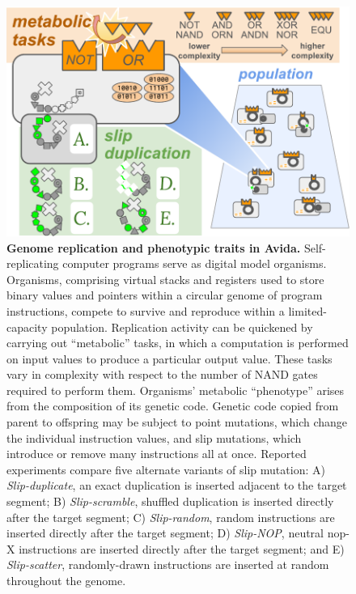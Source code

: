 \begin{figure}[!ht]
  \centering
  \includegraphics[width=\linewidth]{imgs/GeneDupeOps.pdf}
    \caption{%
 \textbf{Genome replication and phenotypic traits in Avida.}
 \footnotesize
 Self-replicating computer programs serve as digital model organisms.
 Organisms, comprising virtual stacks and registers used to store binary values and pointers within a circular genome of program instructions, compete to survive and reproduce within a limited-capacity population.
 Replication activity can be quickened by carrying out ``metabolic'' tasks, in which a computation is performed on input values to produce a particular output value.
 These tasks vary in complexity with respect to the number of NAND gates required to perform them.
 Organisms' metabolic ``phenotype'' arises from the composition of its genetic code.
 Genetic code copied from parent to offspring may be subject to point mutations, which change the individual instruction values, and slip mutations, which introduce or remove many instructions all at once.
 Reported experiments compare five alternate variants of slip mutation:
 A) \textit{Slip-duplicate}, an exact duplication is inserted adjacent to the target segment;
 B) \textit{Slip-scramble}, shuffled duplication is inserted directly after the target segment;
 C) \textit{Slip-random}, random instructions are inserted directly after the target segment;
 D) \textit{Slip-NOP}, neutral nop-X instructions are inserted directly after the target segment; and
 E) \textit{Slip-scatter}, randomly-drawn instructions are inserted at random throughout the genome.
 }
    \label{fig:slip_mut_variants}
\end{figure}
